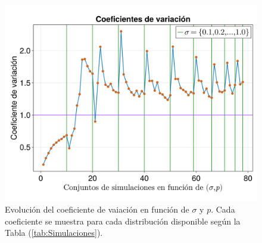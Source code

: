 \begin{figure}[h!]
	\centering
	\includegraphics[scale=0.24]{../Imagenes/CoeficientesVariacion}
	\caption{Evolución del coeficiente de vaiación en función de $\sigma$ y $p$. Cada coeficiente se muestra para cada distribución disponible según la Tabla (\ref{tab:Simulaciones}).}
	\label{fig:CoeficientesVariacion}
\end{figure}

